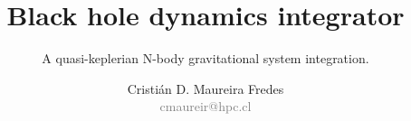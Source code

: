 \documentclass{beamer}
\author[Cristián D. Maureira Fredes]
       {\large Cristián D. Maureira Fredes\\
        \normalsize \textcolor{gray}{cmaureir@hpc.cl}}
\title[BH Integrator]
      {\Huge Black hole dynamics integrator}
\subtitle{
      A quasi-keplerian N-body
      gravitational system integration.
     }
\institute[UTFSM]
          {Universidad Técnica\\
           Federico Santa María}
\begin{document}
\begin{frame}[t,plain]
\titlepage
\end{frame}




\begin{frame}[t,plain]
\titlepage
\end{frame}
\end{document}
